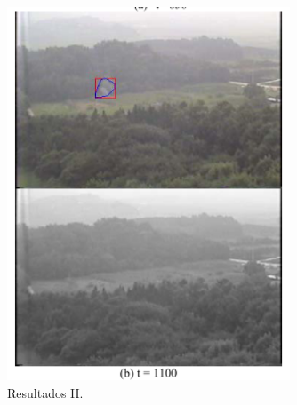 \documentclass{beamer}
\begin{document}
\begin{frame}{}
\begin{columns}
		\begin{column}{0.5\textwidth}
			\begin{figure}[H]
				\centering
				\begin{center}
				\includegraphics[width=0.75\textwidth]{img/fig2-artigo3-ii.png}
			  \caption{Resultados II.}
				\label{fig:sar}
			  \end{center}
			\end{figure}
		\end{column}
	\end{columns}
\end{frame}


\section{}
\end{document}
